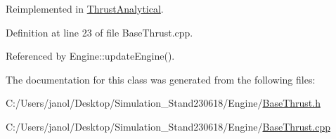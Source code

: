 Reimplemented in \hyperlink{class_thrust_analytical_a2ef6fcb3ba436e41940573917027b9e5}{Thrust\+Analytical}.



Definition at line 23 of file Base\+Thrust.\+cpp.



Referenced by Engine\+::update\+Engine().



The documentation for this class was generated from the following files\+:\begin{DoxyCompactItemize}
\item 
C\+:/\+Users/janol/\+Desktop/\+Simulation\+\_\+\+Stand230618/\+Engine/\hyperlink{_base_thrust_8h}{Base\+Thrust.\+h}\item 
C\+:/\+Users/janol/\+Desktop/\+Simulation\+\_\+\+Stand230618/\+Engine/\hyperlink{_base_thrust_8cpp}{Base\+Thrust.\+cpp}\end{DoxyCompactItemize}
